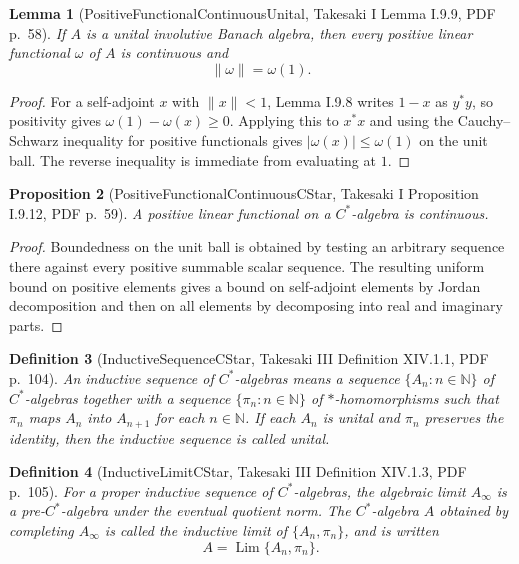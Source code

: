 \documentclass{article}
\newtheorem{definition}{Definition}
\newtheorem{lemma}[definition]{Lemma}
\newtheorem{proposition}[definition]{Proposition}
\begin{document}
\begin{lemma}[PositiveFunctionalContinuousUnital, Takesaki I Lemma I.9.9, PDF p.~58]
If \(A\) is a unital involutive Banach algebra, then every positive linear
functional \(\omega\) of \(A\) is continuous and
\[
  \|\omega\|=\omega(1).
\]
\end{lemma}

\begin{proof}
For a self-adjoint \(x\) with \(\|x\|<1\), Lemma I.9.8 writes \(1-x\) as
\(y^*y\), so positivity gives \(\omega(1)-\omega(x)\geq0\).  Applying this to
\(x^*x\) and using the Cauchy--Schwarz inequality for positive functionals
gives \(|\omega(x)|\leq\omega(1)\) on the unit ball.  The reverse inequality is
immediate from evaluating at \(1\).
\end{proof}

\begin{proposition}[PositiveFunctionalContinuousCStar, Takesaki I Proposition I.9.12, PDF p.~59]
A positive linear functional on a \(C^*\)-algebra is continuous.
\end{proposition}

\begin{proof}
Boundedness on the unit ball is obtained by testing an arbitrary sequence there
against every positive summable scalar sequence.  The resulting uniform bound on
positive elements gives a bound on self-adjoint elements by Jordan decomposition
and then on all elements by decomposing into real and imaginary parts.
\end{proof}

\begin{definition}[InductiveSequenceCStar, Takesaki III Definition XIV.1.1, PDF p.~104]
An inductive sequence of \(C^*\)-algebras means a sequence
\(\{A_n:n\in\mathbb N\}\) of \(C^*\)-algebras together with a sequence
\(\{\pi_n:n\in\mathbb N\}\) of \(*\)-homomorphisms such that \(\pi_n\) maps
\(A_n\) into \(A_{n+1}\) for each \(n\in\mathbb N\).  If each \(A_n\) is
unital and \(\pi_n\) preserves the identity, then the inductive sequence is
called unital.
\end{definition}

\begin{definition}[InductiveLimitCStar, Takesaki III Definition XIV.1.3, PDF p.~105]
For a proper inductive sequence of \(C^*\)-algebras, the algebraic limit
\(A_\infty\) is a pre-\(C^*\)-algebra under the eventual quotient norm.  The
\(C^*\)-algebra \(A\) obtained by completing \(A_\infty\) is called the
inductive limit of \(\{A_n,\pi_n\}\), and is written
\[
  A=\operatorname{Lim}\{A_n,\pi_n\}.
\]
\end{definition}
\end{document}
